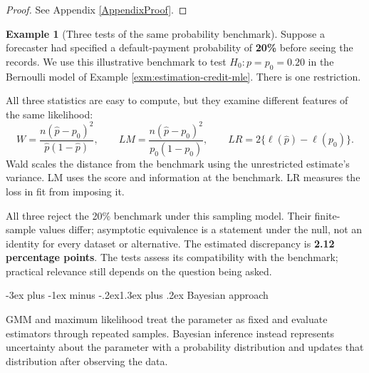 \documentclass[
  11pt,
]{book}
\makeatletter
\renewcommand\section{\@startsection{section}{1}{\z@}
  {-3ex plus -1ex minus -.2ex}{1.3ex plus .2ex}
  {\normalfont\Large\bfseries\color{TextbookInk}}}
\theoremstyle{definition}
\theoremstyle{definition}
\newtheorem{example}{Example}[chapter]
\theoremstyle{definition}
\theoremstyle{definition}
\theoremstyle{remark}
\makeatother
\begin{document}
\begin{proof}
See Appendix \ref{AppendixProof}.
\end{proof}

\begin{example}[Three tests of the same probability benchmark]
\protect\hypertarget{exm:estimation-credit-tests}{}\label{exm:estimation-credit-tests}Suppose a forecaster had specified a default-payment probability of \textbf{20\%} before seeing the records. We use this illustrative benchmark to test \(H_0:p=p_0=0.20\) in the Bernoulli model of Example \ref{exm:estimation-credit-mle}. There is one restriction.

All three statistics are easy to compute, but they examine different features of the same likelihood:
\[
W=\frac{n(\widehat p-p_0)^2}{\widehat p(1-\widehat p)},\qquad
LM=\frac{n(\widehat p-p_0)^2}{p_0(1-p_0)},\qquad
LR=2\{\ell(\widehat p)-\ell(p_0)\}.
\]
Wald scales the distance from the benchmark using the unrestricted estimate's variance. LM uses the score and information at the benchmark. LR measures the loss in fit from imposing it.

\begin{table}[H]
\centering\begingroup\fontsize{10}{12}\selectfont

\endgroup{}
\end{table}

All three reject the 20\% benchmark under this sampling model. Their finite-sample values differ; asymptotic equivalence is a statement under the null, not an identity for every dataset or alternative. The estimated discrepancy is \textbf{2.12 percentage points}. The tests assess its compatibility with the benchmark; practical relevance still depends on the question being asked.
\end{example}

\section{Bayesian approach}\label{bayesian}

GMM and maximum likelihood treat the parameter as fixed and evaluate estimators through repeated samples. Bayesian inference instead represents uncertainty about the parameter with a probability distribution and updates that distribution after observing the data.
\end{document}

